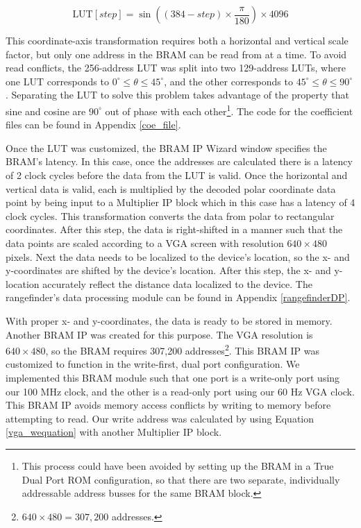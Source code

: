 \begin{equation}
	\textrm{LUT}[step] = \sin((384-step)\times\dfrac{\pi}{180})\times4096
	\label{coe}
\end{equation}

This coordinate-axis transformation requires both a horizontal and vertical scale factor, but only one address in the BRAM can be read from at a time. To avoid read conflicts, the 256-address LUT was split into two 129-address LUTs, where one LUT corresponds to $0^\circ{}\leq{}\theta{}\leq45^\circ$, and the other corresponds to $45^\circ{}\leq{}\theta{}\leq90^\circ$. Separating the LUT to solve this problem takes advantage of the property that sine and cosine are $90^\circ$ out of phase with each other\footnote{This process could have been avoided by setting up the BRAM in a True Dual Port ROM configuration, so that there are two separate, individually addressable address busses for the same BRAM block.}. The code for the coefficient files can be found in Appendix \ref{coe_file}.
\par
Once the LUT was customized, the BRAM IP Wizard window specifies the BRAM's latency. In this case, once the addresses are calculated there is a latency of 2 clock cycles before the data from the LUT is valid. Once the horizontal and vertical data is valid, each is multiplied by the decoded polar coordinate data point by being input to a Multiplier IP block which in this case has a latency of 4 clock cycles. This transformation converts the data from polar to rectangular coordinates. After this step, the data is right-shifted in a manner such that the data points are scaled according to a VGA screen with resolution $640\times480$ pixels. Next the data needs to be localized to the device's location, so the x- and y-coordinates are shifted by the device's location. After this step, the x- and y-location accurately reflect the distance data localized to the device. The rangefinder's data processing module can be found in Appendix \ref{rangefinderDP}.
\par
With proper x- and y-coordinates, the data is ready to be stored in memory. Another BRAM IP was created for this purpose. The VGA resolution is $640\times480$, so the BRAM requires 307,200 addresses\footnote{$640\times480 = 307,200$ addresses.}. This BRAM IP was customized to function in the write-first, dual port configuration. We implemented this BRAM module such that one port is a write-only port using our 100 MHz clock, and the other is a read-only port using our 60 Hz VGA clock. This BRAM IP avoids memory access conflicts by writing to memory before attempting to read. Our write address was calculated by using Equation \ref{vga_wequation} with another Multiplier IP block.

